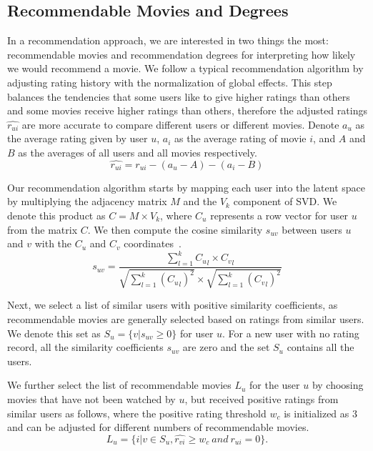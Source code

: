 \documentclass{vgtc}                          %
\begin{document}
\subsection{Recommendable Movies and Degrees}


In a recommendation approach, we are interested in two things the most: recommendable movies and recommendation degrees for interpreting how likely we would recommend a movie.
We follow a typical recommendation algorithm by adjusting rating history with the normalization of global effects. 
This step balances the tendencies that some users like to give higher ratings than others and some movies receive higher ratings than others, therefore the adjusted ratings $\hat{r_{ui}}$ are more accurate to compare different users or different movies.
Denote $a_{u}$ as the average rating given by user $u$, $a_{i}$ as the average rating of movie $i$, and $A$ and $B$ as the averages of all users and all movies respectively. 
\begin{equation}
\hat{r_{ui}} = r_{ui} - (a_{u} - A) - (a_{i} - B)
\end{equation}

Our recommendation algorithm starts by mapping each user into the latent space by multiplying the adjacency matrix $M$ and the $V_k$ component of SVD.
We denote this product as $C=M \times V_k$, where $C_u$ represents a row vector for user $u$ from the matrix $C$.
We then compute the cosine similarity $s_{uv}$ between users $u$ and $v$ %
with the $C_u$ and $C_v$ coordinates~\cite{leskovec2014mining}.
\begin{equation}
s_{uv} =  \frac{\displaystyle\sum_{l=1}^{k} {C_u}_l \times {C_v}_l}
  			 {\sqrt{\displaystyle\sum_{l=1}^{k} ({C_u}_l)^2 } \times 
  			  \sqrt{\displaystyle\sum_{l=1}^{k} ({C_v}_l)^2 } }    
\label{similarity}     
\end{equation}

Next, we select a list of similar users with positive similarity coefficients, as recommendable movies are generally selected based on ratings from similar users.
We denote this set as $S_u=\lbrace v | s_{uv} \geq 0 \rbrace $ for user $u$.
For a new user with no rating record, all the similarity coefficients $s_{uv}$ are zero and the set $S_u$ contains all the users.

We further select the list of recommendable movies $L_u$ for the user $u$ by choosing movies that have not been watched by $u$, but received positive ratings from similar users as follows, where the positive rating threshold $w_c$ is initialized as $3$ and can be adjusted for different numbers of recommendable movies.
\begin{equation}
L_u=\lbrace i | v \in S_u, \hat{r_{vi}} \ge w_c \ and \ r_{ui}=0 \rbrace. 
\end{equation}
\end{document}
